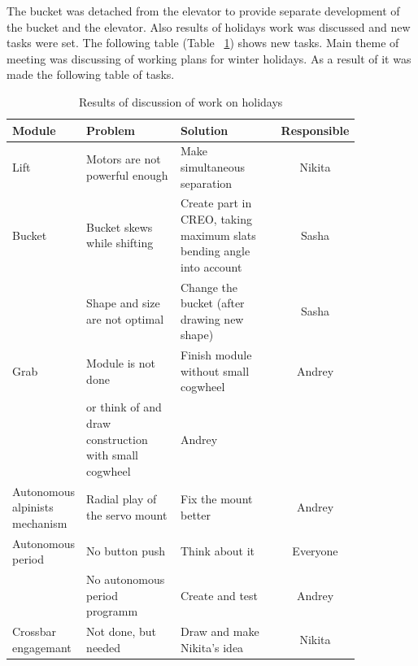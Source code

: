 The bucket was detached from the elevator to provide separate development of the bucket and the elevator.
Also results of holidays work was discussed and new tasks were set. The following table (Table ~\ref{tabular:meetingSPB10.01}) shows new tasks.
Main theme of meeting was discussing of working plans for winter holidays. As a result of it was made the following table of tasks.
\begin{table}[H]
	\caption{Results of discussion of work on holidays}
	\label{tabular:meetingSPB10.01}
	\begin{center}
		\begin{tabular}{p{0.12\linewidth}|p{0.35\linewidth}|p{0.38\linewidth}|c}
		  \textbf{Module} & \textbf{Problem} & \textbf{Solution} & \textbf{Responsible} \\
		  \hline 
		  Lift	& Motors are not powerful enough & Make simultaneous separation &	Nikita \\
		  \hline
		  Bucket & Bucket skews while shifting & Create part in CREO, taking maximum slats bending angle into account & Sasha \\
		   & Shape and size are not optimal & Change the bucket (after drawing new shape) &	Sasha \\
		  \hline
		  Grab	& Module is not done & Finish module without small cogwheel	& Andrey \\
		  & or think of and draw construction with small cogwheel	& Andrey \\
		  \hline
		  Autonomous alpinists mechanism & Radial play of the servo mount & Fix the mount better & Andrey \\
		  \hline
		  Autonomous period & No button push & Think about it & Everyone\\
		  & No autonomous period programm	& Create and test & Andrey\\	
		  \hline
		  Crossbar engagemant & Not done, but needed & Draw and make Nikita's idea & Nikita \\
		  \hline
		\end{tabular}
	\end{center}
\end{table}
